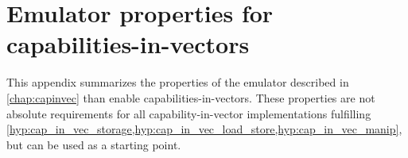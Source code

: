 \chapter{Emulator properties for capabilities-in-vectors\label{appx:emucapinvec}}

This appendix summarizes the properties of the emulator described in \cref{chap:capinvec} than enable capabilities-in-vectors.
These properties are not absolute requirements for all capability-in-vector implementations fulfilling \cref{hyp:cap_in_vec_storage,hyp:cap_in_vec_load_store,hyp:cap_in_vec_manip}, but can be used as a starting point.

        
        
        
        

